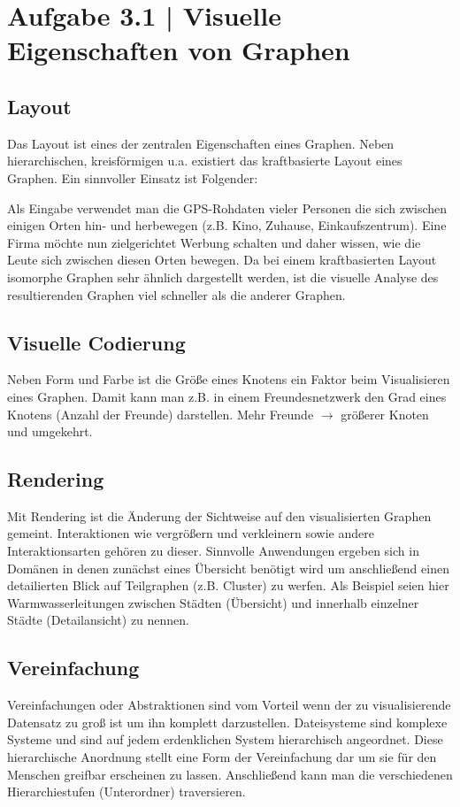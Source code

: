 \documentclass[a4paper,12pt,ngerman]{scrartcl}
\begin{document}
\pagestyle{fancy} %

\section{Aufgabe 3.1 | Visuelle Eigenschaften von Graphen}
\subsection*{Layout}
Das Layout ist eines der zentralen Eigenschaften eines Graphen. Neben hierarchischen, kreisförmigen u.a. existiert das kraftbasierte Layout eines Graphen. Ein sinnvoller Einsatz ist Folgender:

Als Eingabe verwendet man die GPS-Rohdaten vieler Personen die sich zwischen einigen Orten hin- und herbewegen (z.B. Kino, Zuhause, Einkaufszentrum). Eine Firma möchte nun zielgerichtet Werbung schalten und daher wissen, wie die Leute sich zwischen diesen Orten bewegen. Da bei einem kraftbasierten Layout isomorphe Graphen sehr ähnlich dargestellt werden, ist die visuelle Analyse des resultierenden Graphen viel schneller als die anderer Graphen.

\subsection*{Visuelle Codierung}
Neben Form und Farbe ist die Größe eines Knotens ein Faktor beim Visualisieren eines Graphen. Damit kann man z.B. in einem Freundesnetzwerk den Grad eines Knotens (Anzahl der Freunde) darstellen. Mehr Freunde $\rightarrow$ größerer Knoten und umgekehrt.

\subsection*{Rendering}
Mit Rendering ist die Änderung der Sichtweise auf den visualisierten Graphen gemeint. Interaktionen wie vergrößern und verkleinern sowie andere Interaktionsarten gehören zu dieser. Sinnvolle Anwendungen ergeben sich in Domänen in denen zunächst eines Übersicht benötigt wird um anschließend einen detailierten Blick auf Teilgraphen (z.B. Cluster) zu werfen. Als Beispiel seien hier Warmwasserleitungen zwischen Städten (Übersicht) und innerhalb einzelner Städte (Detailansicht) zu nennen.

\subsection*{Vereinfachung}
Vereinfachungen oder Abstraktionen sind vom Vorteil wenn der zu visualisierende Datensatz zu groß ist um ihn komplett darzustellen. Dateisysteme sind komplexe Systeme und sind auf jedem erdenklichen System hierarchisch angeordnet. Diese hierarchische Anordnung stellt eine Form der Vereinfachung dar um sie für den Menschen greifbar erscheinen zu lassen. Anschließend kann man die verschiedenen Hierarchiestufen (Unterordner) traversieren.
\end{document}
